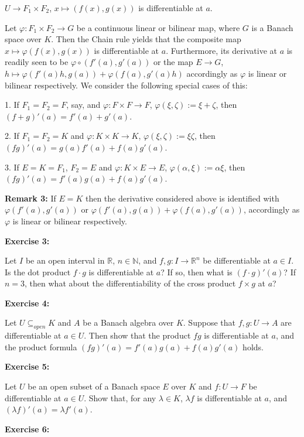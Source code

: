 \documentclass{book}
\begin{document}
$U \to F_1 \times F_2$, $x \mapsto (f(x), g(x))$ is differentiable at $a$. 

Let $\varphi : F_1 \times F_2 \to G$ be a continuous linear or bilinear map, 
where $G$ is a Banach space over $K$. Then the Chain rule yields that the composite map $x \mapsto \varphi(f(x), g(x))$ is differentiable at $a$. Furthermore, its derivative at $a$ is readily seen to be $\varphi \circ (f'(a), g'(a))$ or the map $E \to G$, $h \mapsto \varphi(f'(a)h, g(a)) + \varphi(f(a), g'(a)h)$ accordingly as $\varphi$ is linear or bilinear respectively. We consider the following special cases of this:

1. If $F_1 = F_2 = F$, say, and $\varphi : F \times F \to F$, $\varphi(\xi, \zeta) := \xi + \zeta$, then $(f + g)'(a) = f'(a) + g'(a)$.

2. If $F_1 = F_2 = K$ and $\varphi : K \times K \to K$, $\varphi(\xi, \zeta) := \xi \zeta$, then $(fg)'(a) = g(a)f'(a) + f(a)g'(a)$.

3. If $E = K = F_1$, $F_2 = E$ and $\varphi : K \times E \to E$, $\varphi(\alpha, \xi) := \alpha \xi$, then $(fg)'(a) = f'(a)g(a) + f(a)g'(a)$.

\textbf{Remark 3:} If $E = K$ then the derivative considered above is identified with $\varphi(f'(a), g'(a))$ or $\varphi(f'(a), g(a)) + \varphi(f(a), g'(a))$, accordingly as $\varphi$ is linear or bilinear respectively.

\newpage
\textbf{Exercise 3:}

Let $I$ be an open interval in $\mathbb{R}$, $n \in \mathbb{N}$, and $f, g : I \to \mathbb{R}^n$ be differentiable at $a \in I$. Is the dot product $f \cdot g$ is differentiable at $a$? If so, then what is $(f \cdot g)'(a)$? If $n = 3$, then what about the differentiability of the cross product $f \times g$ at $a$?

\textbf{Exercise 4:}

Let $U \subseteq_{open} K$ and $A$ be a Banach algebra over $K$. Suppose that $f, g : U \to A$ are differentiable at $a \in U$. Then show that the product $fg$ is differentiable at $a$, and the product formula $(fg)'(a) = f'(a)g(a) + f(a)g'(a)$ holds.

\textbf{Exercise 5:}

Let $U$ be an open subset of a Banach space $E$ over $K$ and $f : U \to F$ be differentiable at $a \in U$. Show that, for any $\lambda \in K$, $\lambda f$ is differentiable at $a$, and $(\lambda f)'(a) = \lambda f'(a)$.

\textbf{Exercise 6:}
\end{document}
